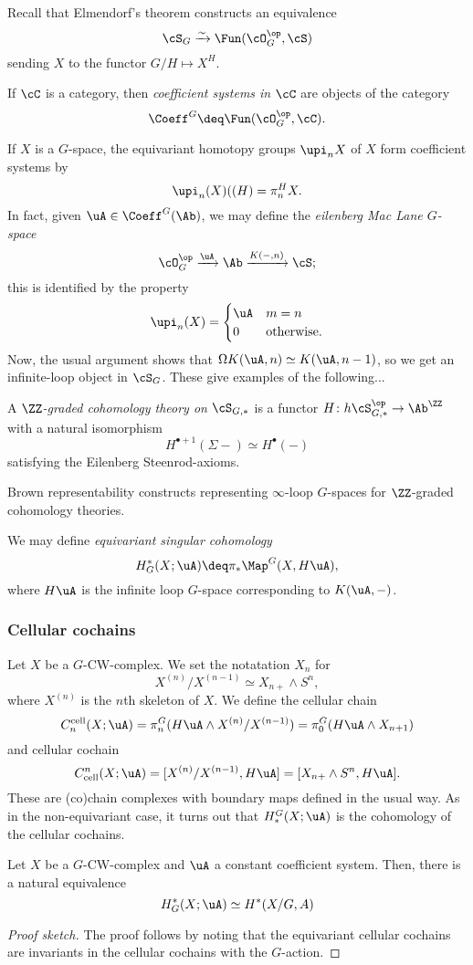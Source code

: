 Recall that Elmendorf's theorem constructs an equivalence
\[
  \cS_G \xrightarrow\sim \Fun(\cO_G^{\op}, \cS)
\]
sending $X$ to the functor $G/H \mapsto X^H$.
\begin{definition}
  If $\cC$ is a category, then \emph{coefficient systems in $\cC$} are objects of the category
  \[
    \Coeff^G \deq \Fun(\cO_G^{\op},\cC).
  \]
\end{definition}

If $X$ is a $G$-space, the equivariant homotopy groups $\upi_nX$ of $X$ form coefficient systems by
\[
  \upi_n(X)((H) = \pi_n^H X.
\]
In fact, given $\uA \in \Coeff^G(\Ab)$, we may define the \emph{eilenberg Mac Lane $G$-space}
\[
  \cO_G^{\op} \xrightarrow{\uA} \Ab \xrightarrow{K(-,n)} \cS;
\]
this is identified by the property
\[
  \upi_n(X) = \begin{cases}
    \uA & m = n \\ 
    0 & \mathrm{otherwise}. 
  \end{cases}
\]
Now, the usual argument shows that $\Omega K(\uA,n) \simeq K(\uA,n-1)$, so we get an infinite-loop object in $\cS_G$.
These give examples of the following...
\begin{definition}
  A \emph{$\ZZ$-graded cohomology theory on $\cS_{G,*}$} is a functor $H\colon h \cS_{G,*}^{\op} \rightarrow \Ab^{\ZZ}$ with a natural isomorphism
  \[
    H^{\bullet + 1}(\Sigma -) \simeq H^\bullet(-)
  \]
  satisfying the Eilenberg Steenrod-axioms.
\end{definition}
Brown representability constructs representing $\infty$-loop $G$-spaces for $\ZZ$-graded cohomology theories.
\begin{example}
  We may define \emph{equivariant singular cohomology}
  \[
    H^*_G(X;\uA) \deq \pi_* \Map^G(X,H\uA),
  \]
  where $H\uA$ is the infinite loop $G$-space corresponding to $K(\uA,-)$.
\end{example}

\subsubsection{Cellular cochains}%
Let $X$ be a $G$-CW-complex.
We set the notatation $X_{n}$ for
\[
  X^{(n)}/X^{(n-1)} \simeq X_{n+} \wedge S^n,
\] 
where $X^(n)$ is the $n$th skeleton of $X$.
We define the cellular chain
\[
  C_n^{\mathrm{cell}}(X;\uA) = \pi_n^G(H\uA \wedge X^{(n)}/X^{(n-1)}) = \pi_0^G(H\uA \wedge X_{n+1})
\]
and cellular cochain
\[
  C^n_{\mathrm{cell}}(X;\uA) = [X^{(n)}/X^{(n-1)},H\uA] = [X_{n+} \wedge S^n, H\uA].
\]
These are (co)chain complexes with boundary maps defined in the usual way.
As in the non-equivariant case, it turns out that $H_*^G(X;\uA)$ is the cohomology of the cellular cochains.
\begin{lemma}\label{blah lem}\cite[Example 3.9]{HHR}
  Let $X$ be a $G$-CW-complex and $\uA$ a constant coefficient system.
  Then, there is a natural equivalence
    \[
      H^*_G(X;\uA) \simeq H^*(X/G,A)
    \]
\end{lemma}
\begin{proof}[Proof sketch]
  The proof follows by noting that the equivariant cellular cochains are invariants in the cellular cochains with the $G$-action.
\end{proof}


